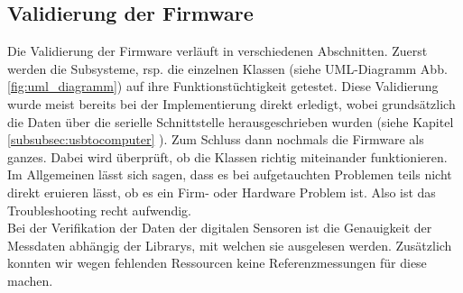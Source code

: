 \subsection{Validierung der Firmware}
\label{subsec:validierung_Firmware}
Die Validierung der Firmware verläuft in verschiedenen Abschnitten. Zuerst werden die Subsysteme, rsp. die einzelnen Klassen (siehe UML-Diagramm Abb. \ref{fig:uml_diagramm}) auf ihre Funktionstüchtigkeit getestet. Diese Validierung wurde meist bereits bei der Implementierung direkt erledigt, wobei grundsätzlich die Daten über die serielle Schnittstelle herausgeschrieben wurden (siehe Kapitel \ref{subsubsec:usbtocomputer} ). Zum Schluss dann nochmals die Firmware als ganzes. Dabei wird überprüft, ob die Klassen richtig miteinander funktionieren.\\

Im Allgemeinen lässt sich sagen, dass es bei aufgetauchten Problemen teils nicht direkt eruieren lässt, ob es ein Firm- oder Hardware Problem ist. Also ist das Troubleshooting recht aufwendig.\\

Bei der Verifikation der Daten der digitalen Sensoren ist die Genauigkeit der Messdaten abhängig der Librarys, mit welchen sie ausgelesen werden. Zusätzlich konnten wir wegen fehlenden Ressourcen keine Referenzmessungen für diese machen.\\

